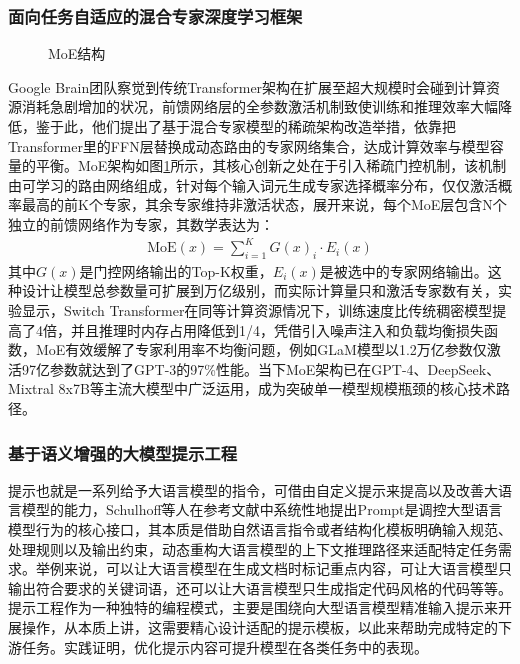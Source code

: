\documentclass[UTF8,a4paper,12pt]{ctexart}
\numberwithin{equation}{section}
\begin{document}
\subsubsection{面向任务自适应的混合专家深度学习框架}
\begin{figure}[H]
	\caption{MoE结构}
	\label{MoE}
\end{figure}
Google Brain团队察觉到传统Transformer架构在扩展至超大规模时会碰到计算资源消耗急剧增加的状况，前馈网络层的全参数激活机制致使训练和推理效率大幅降低，鉴于此，他们提出了基于混合专家模型\cite{ref15}的稀疏架构改造举措，依靠把Transformer里的FFN层替换成动态路由的专家网络集合，达成计算效率与模型容量的平衡。MoE架构如图\ref{MoE}所示，其核心创新之处在于引入稀疏门控机制，该机制由可学习的路由网络组成，针对每个输入词元生成专家选择概率分布，仅仅激活概率最高的前K个专家，其余专家维持非激活状态，展开来说，每个MoE层包含N个独立的前馈网络作为专家，其数学表达为：
\begin{eqnarray}
	\mathrm{MoE}(x)=\sum_{i=1}^KG(x)_i\cdot E_i(x)
	\label{func_5}
\end{eqnarray}
其中$G(x)$是门控网络输出的Top-K权重，$E_i(x)$是被选中的专家网络输出。这种设计让模型总参数量可扩展到万亿级别，而实际计算量只和激活专家数有关，实验显示，Switch Transformer在同等计算资源情况下，训练速度比传统稠密模型提高了4倍，并且推理时内存占用降低到1/4，凭借引入噪声注入和负载均衡损失函数，MoE有效缓解了专家利用率不均衡问题，例如GLaM模型以1.2万亿参数仅激活97亿参数就达到了GPT-3的97\%性能。当下MoE架构已在GPT-4、DeepSeek、Mixtral 8x7B等主流大模型中广泛运用，成为突破单一模型规模瓶颈的核心技术路径。

\subsubsection{基于语义增强的大模型提示工程}
提示也就是一系列给予大语言模型的指令，可借由自定义提示来提高以及改善大语言模型的能力，Schulhoff等人在参考文献\cite{ref16}中系统性地提出Prompt是调控大型语言模型行为的核心接口，其本质是借助自然语言指令或者结构化模板明确输入规范、处理规则以及输出约束，动态重构大语言模型的上下文推理路径来适配特定任务需求。举例来说，可以让大语言模型在生成文档时标记重点内容，可让大语言模型只输出符合要求的关键词语，还可以让大语言模型只生成指定代码风格的代码等等。提示工程作为一种独特的编程模式，主要是围绕向大型语言模型精准输入提示来开展操作，从本质上讲，这需要精心设计适配的提示模板，以此来帮助完成特定的下游任务。实践证明，优化提示内容可提升模型在各类任务中的表现。\par
\end{document}
